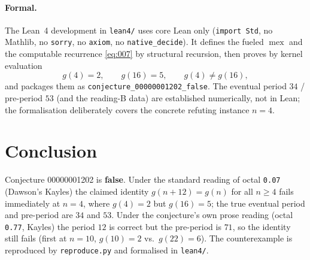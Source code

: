 \documentclass[11pt]{article}
\newcommand{\mex}{\operatorname{mex}}
\newcommand{\Sg}{g}
\begin{document}
\paragraph{Formal.} The Lean~4 development in \texttt{lean4/} uses core
Lean only (\texttt{import Std}, no Mathlib, no \texttt{sorry}, no
\texttt{axiom}, no \texttt{native\_decide}). It defines the fueled
$\mex$ and the computable recurrence \eqref{eq:007} by structural
recursion, then proves by kernel evaluation
\[
  \Sg(4)=2,\qquad \Sg(16)=5,\qquad \Sg(4)\ne\Sg(16),
\]
and packages them as \texttt{conjecture\_00000001202\_false}. The
eventual period $34$ / pre-period $53$ (and the reading-B data) are
established numerically, not in Lean; the formalisation deliberately
covers the concrete refuting instance $n=4$.

\section{Conclusion}

Conjecture 00000001202 is \textbf{false}. Under the standard reading of
octal \texttt{0.07} (Dawson's Kayles) the claimed identity
$\Sg(n+12)=\Sg(n)$ for all $n\ge4$ fails immediately at $n=4$, where
$\Sg(4)=2$ but $\Sg(16)=5$; the true eventual period and pre-period are
$34$ and $53$. Under the conjecture's own prose reading (octal
\texttt{0.77}, Kayles) the period $12$ is correct but the pre-period is
$71$, so the identity still fails (first at $n=10$, $\Sg(10)=2$ vs.\
$\Sg(22)=6$). The counterexample is reproduced by \texttt{reproduce.py}
and formalised in \texttt{lean4/}.
\end{document}

